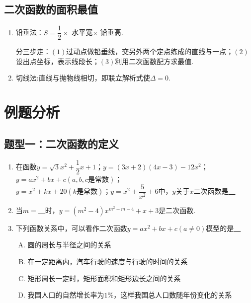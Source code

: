\documentclass[10pt]{ctexart}
\begin{document}
\subsection{二次函数的面积最值}
\begin{enumerate}
\item 铅垂法：$S=\dfrac{1}{2}\times$ 水平宽$\times$ 铅垂高.

分三步走：$(1)$过动点做铅垂线，交另外两个定点练成的直线与一点；$(2)$设出点坐标，表示线段长；$(3)$利用二次函数配方求最值.
\item 切线法:直线与抛物线相切，即联立解析式使$\Delta=0$.
\end{enumerate}
\section{例题分析}
\subsection{题型一：二次函数的定义}
\begin{dkyi}{}{}
   \begin{enumerate}[(1)]
   \item 在函数$y=\sqrt{3}x^2+\dfrac{1}{2}x+1$；$y=(3x+2)(4x-3)-12x^2$；$y=ax^2+bx+c(a,b,c\text{是常数})$；\\ $y=x^2+kx+20(k\text{是常数})$；$y=x^2+\dfrac{5}{x^2}+6$中，$y$关于$x$二次函数是\underline{~\hspace{2cm}~}
   \item 当$m=$\underline{~\hspace{2cm}~}时，$y=(m^2-4)x^{m^2-m-4}+x+3$是二次函数.
   \item 下列函数关系中，可以看作二次函数$y=ax^2+bx+c(a\neq 0)$模型的是\underline{~\hspace{2cm}~}
   \begin{enumerate}[A.]
   \item 圆的周长与半径之间的关系
   \item 在一定距离内，汽车行驶的速度与行驶的时间的关系
   \item 矩形周长一定时，矩形面积和矩形边长之间的关系
   \item 我国人口的自然增长率为$1\%$，这样我国总人口数随年份变化的关系
   \end{enumerate}
   \end{enumerate}
\end{dkyi}
\end{document}
